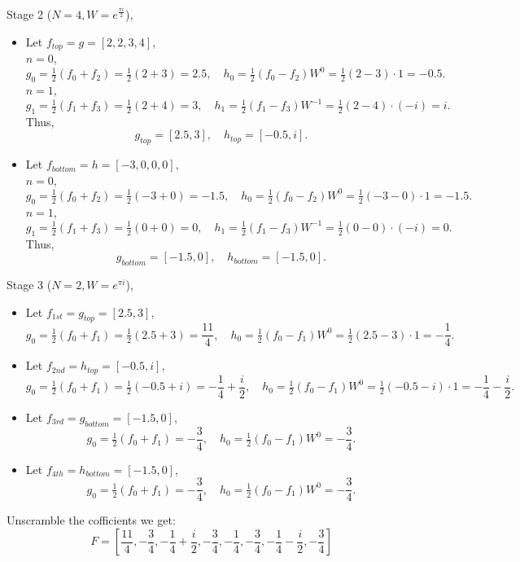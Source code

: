 \documentclass{article}
\begin{document}
Stage 2 (\(N=4, W=e^{\frac{\pi i}{2}}\)),
\begin{itemize}
    \item Let $f_{top}=g = [ 2, 2, 3, 4 ]$,\\
          $n=0$,
          $$
              g_0 = \tfrac12(f_0 + f_2)
              = \tfrac12(2+3) = 2.5,
              \quad
              h_0 = \tfrac12(f_0 - f_2) W^{0}
              = \tfrac12(2-3)\cdot 1
              = -0.5.
          $$
          $n=1$,
          $$
              g_1 = \tfrac12(f_1 + f_3)
              = \tfrac12(2+4) = 3,
              \quad
              h_1 = \tfrac12(f_1 - f_3) W^{-1}
              = \tfrac12(2-4)\cdot (-i)
              = i.
          $$
          Thus,
          $$
              g_{top}=[2.5,3],
              \quad
              h_{top}=[-0.5,i].
          $$
    \item Let $f_{bottom}=h = [ -3,0,0,0 ]$,\\
          $n=0$,
          $$
              g_0 = \tfrac12(f_0 + f_2)
              = \tfrac12(-3+0) = -1.5,
              \quad
              h_0 = \tfrac12(f_0 - f_2) W^{0}
              = \tfrac12(-3-0)\cdot 1
              = -1.5.
          $$
          $n=1$,
          $$
              g_1 = \tfrac12(f_1 + f_3)
              = \tfrac12(0+0) = 0,
              \quad
              h_1 = \tfrac12(f_1 - f_3) W^{-1}
              = \tfrac12(0-0)\cdot (-i)
              = 0.
          $$
          Thus,
          $$
              g_{bottom}=[-1.5,0],
              \quad
              h_{bottom}=[-1.5,0].
          $$
\end{itemize}

Stage 3 (\(N=2, W=e^{\pi i}\)),
\begin{itemize}
    \item Let $f_{1st}=g_{top}=[2.5,3]$,
          $$
              g_0 = \tfrac12(f_0 + f_1)
              = \tfrac12(2.5+3) = \frac{11}{4},
              \quad
              h_0 = \tfrac12(f_0 - f_1) W^{0}
              = \tfrac12(2.5-3)\cdot 1
              = -\frac{1}{4}.
          $$
    \item Let $f_{2nd}=h_{top}=[-0.5,i]$,
          $$
              g_0 = \tfrac12(f_0 + f_1)
              = \tfrac12(-0.5+i) = -\frac{1}{4}+\frac{i}{2},
              \quad
              h_0 = \tfrac12(f_0 - f_1) W^{0}
              = \tfrac12(-0.5-i)\cdot 1
              = -\frac{1}{4}-\frac{i}{2}.
          $$
    \item Let $f_{3rd}=g_{bottom}=[-1.5,0]$,
          $$
              g_0 = \tfrac12(f_0 + f_1)
              = -\frac{3}{4},
              \quad
              h_0 = \tfrac12(f_0 - f_1) W^{0}
              = -\frac{3}{4}.
          $$
    \item Let $f_{4th}=h_{bottom}=[-1.5,0]$,
          $$
              g_0 = \tfrac12(f_0 + f_1)
              = -\frac{3}{4},
              \quad
              h_0 = \tfrac12(f_0 - f_1) W^{0}
              = -\frac{3}{4}.
          $$
\end{itemize}
Unscramble the cofficients we get:
$$
    \boxed{
        F=[\frac{11}{4}, -\frac{3}{4}, -\frac{1}{4}+\frac{i}{2}, -\frac{3}{4}, -\frac{1}{4}, -\frac{3}{4}, -\frac{1}{4}-\frac{i}{2}, -\frac{3}{4}]
    }
$$
\end{document}
